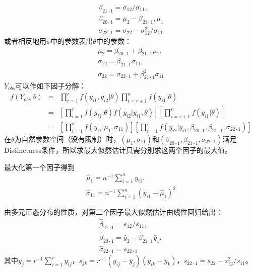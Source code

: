 \documentclass[aps,pre,12pt,preprint,onecolumn,showpacs,showkeys,AutoFakeBold]{revtex4-1}
\begin{document}
    \begin{eqnarray}\label{eq:definition}
        \beta _{21 \cdot 1}=\sigma _{12}/ \sigma _{11},\nonumber \\
        \beta _{20 \cdot 1}=\mu _2 - \beta _{21\cdot 1}, \mu _1 \nonumber \\
        \sigma _{22 \cdot 1}=\sigma _{22} - \sigma _{12}^2/\sigma _{11}
    \end{eqnarray}
    或者相反地用$\phi$中的参数表出$\theta$中的参数：
    \begin{eqnarray}\label{eq:transform}
        \mu _2 = \beta _{20\cdot 1}+\beta _{21\cdot 1} \mu _1,\nonumber \\
        \sigma _{12}=\beta _{21 \cdot 1} \sigma _{11}, \nonumber \\
        \sigma _{22}= \sigma _{22 \cdot 1}+\beta _{21\cdot 1}^2\sigma _{11}
    \end{eqnarray}
    $Y_{obs}$可以作如下因子分解：
    \begin{eqnarray}\label{eq:factorization}
        f(Y_{obs}\vert \theta)&=& \prod _{i=1}^r f(y_{i1},y_{i2}\vert \theta) \prod _{i=r+1}^n f(y_{i1}\vert \theta)\nonumber \\
        &=&\left[\prod _{i=1}^r f(y_{i1}\vert \theta) f(y_{i2}\vert y_{i1},\theta)\right]\left[\prod _{i=r+1}^n f(y_{i1}\vert \theta)\right]\nonumber \\
        &=&\left[\prod _{i=1}^n f(y_{i1}\vert \mu _1 ,\sigma _{11})\right]\left[\prod _{i=1}^r f(y_{i2} \vert y_{i1}, \beta _{20\cdot 1}, \beta _{21\cdot 1}, \sigma _{22\cdot 1}) \right]
    \end{eqnarray}
    在$\theta$为自然参数空间（没有限制）时，$(\mu _1, \sigma _{11})$和$(\beta _{20\cdot 1},\beta _{21\cdot 1},\sigma _{22\cdot 1})$满足Distinctness条件，所以求最大似然估计只需分别求这两个因子的最大值。

    最大化第一个因子得到
    \begin{eqnarray}
        \hat \mu _1=n^{-1} \sum _{i=1}^n y_{i1},\nonumber\\
        \hat \sigma _{11}=n^{-1} \sum _{i=1}^n (y_{i1}-\hat \mu _1)^2
    \end{eqnarray}
    
    由多元正态分布的性质，对第二个因子最大似然估计由线性回归给出：
    \begin{eqnarray}
        \hat \beta _{21\cdot 1}= s_{12}/s_{11},\nonumber \\
        \hat \beta _{20\cdot 1}=\bar y_2-\hat \beta _{21\cdot 1}\bar y_1,\nonumber \\
        \hat \sigma _{22\cdot 1}=s_{22\cdot 1}
    \end{eqnarray}
    其中$y_j=r^{-1}\sum _{i=1}^r y_{ij}$，$s_{jk}=r^{-1}(y_{ij}-\bar y_j)(y_{ik}-\bar y_k)$，$s_{22\cdot 1}=s_{22}-s_{12}^2/s_{11}$。
\end{document}
